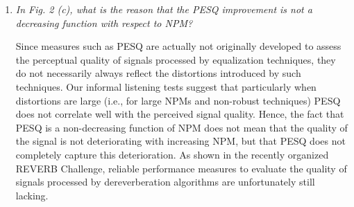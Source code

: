 \documentclass[9pt, a4paper]{article}
\begin{document}
\begin{enumerate}
\item {\it{ In Fig. 2 (c), what is the reason that the PESQ improvement is not a decreasing function with respect to NPM? }}

  Since measures such as PESQ are actually not originally developed to assess the perceptual quality of signals processed by equalization techniques, they do not necessarily always reflect the distortions introduced by such techniques.
Our informal listening tests suggest that particularly when distortions are large (i.e., for large NPMs and non-robust techniques) PESQ does not correlate well with the perceived signal quality.
Hence, the fact that PESQ is a non-decreasing function of NPM does not mean that the quality of the signal is not deteriorating with increasing NPM, but that PESQ does not completely capture this deterioration. 
As shown in the recently organized REVERB Challenge, reliable performance measures to evaluate the quality of signals processed by dereverberation algorithms are unfortunately still lacking. 

\end{enumerate}
\end{document}
